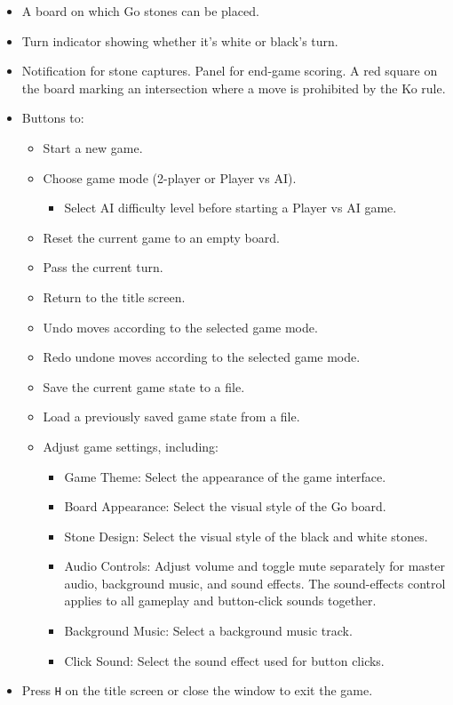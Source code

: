 \begin{itemize}
    \item A board on which Go stones can be placed.
    \item Turn indicator showing whether it's white or black's turn.
    \item Notification for stone captures. Panel for end-game scoring. A red square on the board marking an intersection where a move is prohibited by the Ko rule.
    \item Buttons to:
    \begin{itemize}
        \item Start a new game.
        \item Choose game mode (2-player or Player vs AI).
        \begin{itemize}
            \item Select AI difficulty level before starting a Player vs AI game.
        \end{itemize}
        \item Reset the current game to an empty board.
        \item Pass the current turn.
        \item Return to the title screen.
        \item Undo moves according to the selected game mode.
        \item Redo undone moves according to the selected game mode.
        \item Save the current game state to a file.
        \item Load a previously saved game state from a file.
        \item Adjust game settings, including:
        \begin{itemize}
            \item Game Theme: Select the appearance of the game interface.
            \item Board Appearance: Select the visual style of the Go board.
            \item Stone Design: Select the visual style of the black and white stones.
            \item Audio Controls: Adjust volume and toggle mute separately for master audio, background music, and sound effects. The sound-effects control applies to all gameplay and button-click sounds together.
            \item Background Music: Select a background music track.
            \item Click Sound: Select the sound effect used for button clicks.
        \end{itemize}
    \end{itemize}
    \item Press \texttt{H} on the title screen or close the window to exit the game.
\end{itemize}

